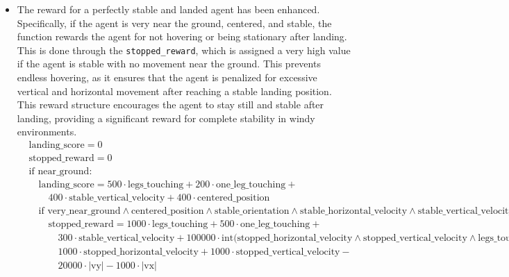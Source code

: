 \documentclass[a4paper, 12pt, fleqn]{report}
\begin{document}
\begin{itemize}
    \item The reward for a perfectly stable and landed agent has been enhanced. Specifically, if the agent is very near the ground, centered, and stable, the function rewards the agent for not hovering or being stationary after landing. This is done through the \texttt{stopped\_reward}, which is assigned a very high value if the agent is stable with no movement near the ground. This prevents endless hovering, as it ensures that the agent is penalized for excessive vertical and horizontal movement after reaching a stable landing position. This reward structure encourages the agent to stay still and stable after landing, providing a significant reward for complete stability in windy environments.
{\scriptsize
\begin{align*}
    & \text{landing\_score} = 0 \\
    & \text{stopped\_reward} = 0 \\[0.5em]
    & \text{if near\_ground:} \\
    & \quad \text{landing\_score} = 
        500 \cdot \text{legs\_touching} +
        200 \cdot \text{one\_leg\_touching} + \\
    & \qquad 
        400 \cdot \text{stable\_vertical\_velocity} +
        400 \cdot \text{centered\_position} \\[0.5em]
    & \quad \text{if very\_near\_ground} \wedge \text{centered\_position} \wedge
        \text{stable\_orientation} \wedge \text{stable\_horizontal\_velocity} \wedge
        \text{stable\_vertical\_velocity:} \\
    & \qquad \text{stopped\_reward} = 
        1000 \cdot \text{legs\_touching} +
        500 \cdot \text{one\_leg\_touching} + \\
    & \qquad \quad
        300 \cdot \text{stable\_vertical\_velocity} + 
        100000 \cdot \text{int}\big(
            \text{stopped\_horizontal\_velocity} \wedge 
            \text{stopped\_vertical\_velocity} \wedge 
            \text{legs\_touching}
        \big) + \\
    & \qquad \quad
        1000 \cdot \text{stopped\_horizontal\_velocity} +
        1000 \cdot \text{stopped\_vertical\_velocity} - \\
    & \qquad \quad
        20000 \cdot |\text{vy}| -
        1000 \cdot |\text{vx}|
\end{align*}
}



\end{itemize}
\end{document}
